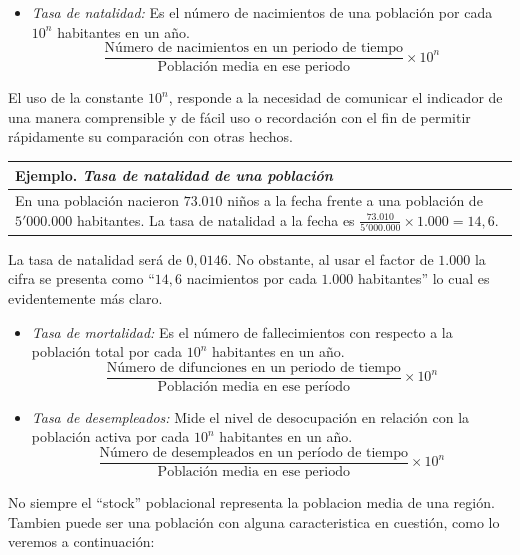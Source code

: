 \documentclass[
]{book}
\providecommand{\tightlist}{%
  \setlength{\itemsep}{0pt}\setlength{\parskip}{0pt}}
\begin{document}
\begin{itemize}
\tightlist
\item
  \emph{Tasa de natalidad:} Es el número de nacimientos de una población por cada \(10^n\) habitantes en un año.
  \[\frac{\text{Número de nacimientos en un periodo de tiempo}}{\text{Población media en ese periodo}}\times 10^n\]
\end{itemize}

El uso de la constante \(10^n\), responde a la necesidad de comunicar el indicador de una manera comprensible y de fácil uso o recordación con el fin de permitir rápidamente su comparación con otras hechos.

\begin{longtable}[]{@{}l@{}}
\toprule
\begin{minipage}[b]{0.97\columnwidth}\raggedright
Ejemplo. \emph{Tasa de natalidad de una población}\strut
\end{minipage}\tabularnewline
\midrule
\endhead
\begin{minipage}[t]{0.97\columnwidth}\raggedright
En una población nacieron \(73.010\) niños a la fecha frente a una población de \(5'000.000\) habitantes. La tasa de natalidad a la fecha es \(\frac{73.010}{5'000.000}\times 1.000=14,6\).\strut
\end{minipage}\tabularnewline
\bottomrule
\end{longtable}

La tasa de natalidad será de \(0,0146\). No obstante, al usar el factor de \(1.000\) la cifra se presenta como ``\(14,6\) nacimientos por cada \(1.000\) habitantes'' lo cual es evidentemente más claro.

\begin{itemize}
\item
  \emph{Tasa de mortalidad:} Es el número de fallecimientos con respecto a la población total por cada \(10^n\) habitantes en un año.
  \[\frac{\text{Número de difunciones en un periodo de tiempo}}{\text{Población media en ese período}}\times 10^n\]
\item
  \emph{Tasa de desempleados:} Mide el nivel de desocupación en relación con la población activa por cada \(10^n\) habitantes en un año.
  \[\frac{\text{Número de desempleados en un período de tiempo}}{\text{Población media en ese periodo}}\times 10^n\]
\end{itemize}

No siempre el ``stock'' poblacional representa la poblacion media de una región. Tambien puede ser una población con alguna caracteristica en cuestión, como lo veremos a continuación:
\end{document}
